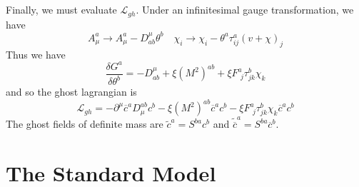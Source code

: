 \documentclass[cyan]{elegantnote}
\begin{document}
\\ \\
Finally, we must evaluate $\mathcal{L}_{gh}$. Under an infinitesimal gauge transformation, we have
\[ A^a_{\mu} \to A^a_{\mu} - D^{\mu}_{ab}\theta^b \quad \chi_i \to \chi_i - \theta^a \tau^a_{ij}(v+\chi)_j \]
Thus we have
\[\frac{\delta G^a}{\delta \theta^b} = - D^{\mu}_{ab} + \xi(M^2)^{ab} + \xi F^a_{\phantom{i}j} \tau^b_{jk}\chi_k \]
and so the ghost lagrangian is
\[\mathcal{L}_{gh} = -\partial^{\mu} \overline{c}^a D_{\mu}^{ab} c^b - \xi (M^2)^{ab}\overline{c}^a c^b - \xi F^a_{\phantom{i}j} \tau^b_{jk}\chi_k \overline{c}^a c^b\]
The ghost fields of definite mass are $\widetilde{c}^a = S^{ba}c^b$ and  $\widetilde{\overline{c}}^a = S^{ba}\overline{c}^b$.

\section{The Standard Model}
\end{document}
